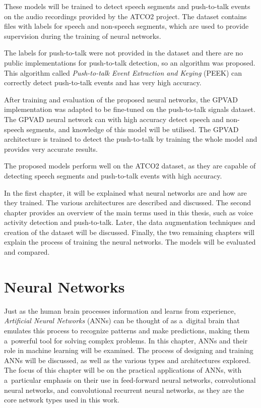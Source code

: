     These models will be trained to detect speech segments and push-to-talk events on the audio recordings provided by the ATCO2 project. The dataset contains files with labels for speech and non-speech segments, which are used to provide supervision during the training of neural networks. 

    The labels for push-to-talk were not provided in the dataset and there are no public implementations for push-to-talk detection, so an algorithm was proposed. This algorithm called \textit{Push-to-talk Event Extraction and Keying} (PEEK) can correctly detect push-to-talk events and has very high accuracy. 
    
    After training and evaluation of the proposed neural networks, the GPVAD implementation was adapted to be fine-tuned on the push-to-talk signals dataset. The GPVAD neural network can with high accuracy detect speech and non-speech segments, and knowledge of this model will be utilised. The GPVAD architecture is trained to detect the push-to-talk by training the whole model and provides very accurate results. 

    The proposed models perform well on the ATCO2 dataset, as they are capable of detecting speech segments and push-to-talk events with high accuracy. 

    In the first chapter, it will be explained what neural networks are and how are they trained. The various architectures are described and discussed. The second chapter provides an overview of the main terms used in this thesis, such as voice activity detection and push-to-talk. Later, the data augmentation techniques and creation of the dataset will be discussed. Finally, the two remaining chapters will explain the process of training the neural networks. The models will be evaluated and compared. 
    

\chapter{Neural Networks}\label{ANN}

Just as the human brain processes information and learns from experience, \textit{Artificial Neural Networks} (ANNs) can be thought of as a~digital brain that emulates this process to recognize patterns and make predictions, making them a~powerful tool for solving complex problems. In this chapter, ANNs and their role in machine learning will be examined. The process of designing and training ANNs will be discussed, as well as the various types and architectures explored. The focus of this chapter will be on the practical applications of ANNs, with a~particular emphasis on their use in feed-forward neural networks, convolutional neural networks, and convolutional recurrent neural networks, as they are the core network types used in this work.

